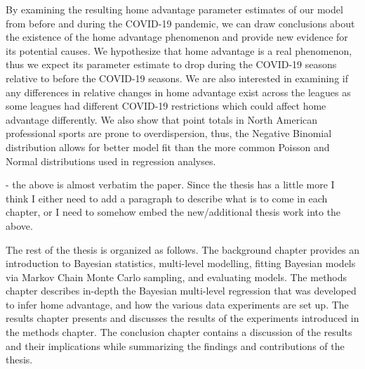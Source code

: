 By examining the resulting home advantage parameter estimates of our model from before and during the COVID-19 pandemic, we can draw conclusions about the existence of the home advantage phenomenon and provide new evidence for its potential causes. We hypothesize that home advantage is a real phenomenon, thus we expect its parameter estimate to drop during the COVID-19 seasons relative to before the COVID-19 seasons. We are also interested in examining if any differences in relative changes in home advantage exist across the leagues as some leagues had different COVID-19 restrictions which could affect home advantage differently. We also show that point totals in North American professional sports are prone to overdispersion, thus, the Negative Binomial distribution allows for better model fit than the more common Poisson and Normal distributions used in regression analyses.

- the above is almost verbatim the paper. Since the thesis has a little more I think I either need to add a paragraph to describe what is to come in each chapter, or I need to somehow embed the new/additional thesis work into the above.

The rest of the thesis is organized as follows. The background chapter provides an introduction to Bayesian statistics, multi-level modelling, fitting Bayesian models via Markov Chain Monte Carlo sampling, and evaluating models. The methods chapter describes in-depth the Bayesian multi-level regression that was developed to infer home advantage, and how the various data experiments are set up. The results chapter presents and discusses the results of the experiments introduced in the methods chapter. The conclusion chapter contains a discussion of the results and their implications while summarizing the findings and contributions of the thesis.